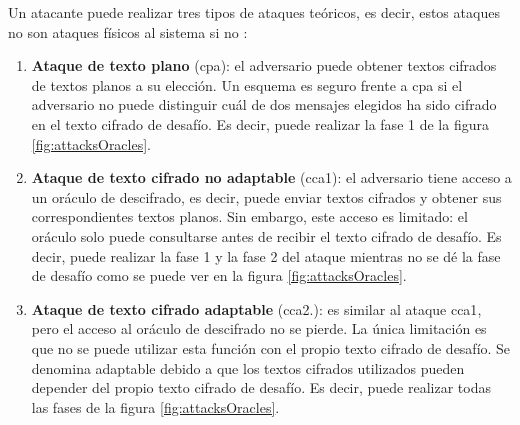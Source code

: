 Un atacante puede realizar tres tipos de ataques teóricos, es decir, estos ataques no son ataques físicos al sistema si no :
\begin{enumerate}
	\item \textbf{Ataque de texto plano} (\acrshort{cpa}): el adversario puede obtener textos cifrados de textos planos a su elección. Un esquema es seguro frente a \acrshort{cpa} si el adversario no puede distinguir cuál de dos mensajes elegidos ha sido cifrado en el texto cifrado de desafío. Es decir, puede realizar la fase 1 de la figura \ref{fig:attacksOracles}.
	\item \textbf{Ataque de texto cifrado no adaptable} (\acrshort{cca1}): el adversario tiene acceso a un oráculo de descifrado, es decir, puede enviar textos cifrados y obtener sus correspondientes textos planos. Sin embargo, este acceso es limitado: el oráculo solo puede consultarse antes de recibir el texto cifrado de desafío. Es decir, puede realizar la fase 1 y la fase 2 del ataque mientras no se dé la fase de desafío como se puede ver en la figura \ref{fig:attacksOracles}.
	\item \textbf{Ataque de texto cifrado adaptable} (\acrshort{cca2.}): es similar al ataque \acrshort{cca1}, pero el acceso al oráculo de descifrado no se pierde. La única limitación es que no se puede utilizar esta función con el propio texto cifrado de desafío. Se denomina adaptable debido a que los textos cifrados utilizados pueden depender del propio texto cifrado de desafío. Es decir, puede realizar todas las fases de la figura \ref{fig:attacksOracles}.
\end{enumerate}
\newpage
